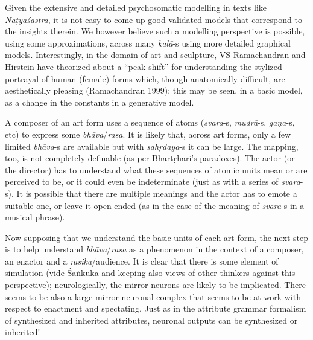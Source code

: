  Given the extensive and detailed psychosomatic modelling in texts like \textsl{Nāṭyaśāstra}, it is not easy to come up good validated models that correspond to the insights therein. We however believe such a modelling perspective is possible, using some approximations, across many \textsl{kalā}-s using more detailed graphical models. Interestingly, in the domain of art and sculpture, VS Ramachandran and Hirstein have theorized about a “peak shift” for understanding the stylized portrayal of human (female) forms which, though anatomically difficult, are aesthetically pleasing (Ramachandran 1999); this may be seen, in a basic model, as a change in the constants in a generative model.

A composer of an art form uses a sequence of atoms (\textsl{svara}-s, \textsl{mudrā}-s, \textsl{gaṇa}-s, etc) to express some \textsl{bhāva}/\textsl{rasa}. It is likely that, across art forms, only a few limited \textsl{bhāva}-s are available but with \textsl{sahṛdaya}-s it can be large. The mapping, too, is not completely definable (as per Bhartṛhari’s paradoxes). The actor (or the director) has to understand what these sequences of atomic units mean or are perceived to be, or it could even be indeterminate (just as with a series of \textsl{svara}-s). It is possible that there are multiple meanings and the actor has to emote a suitable one, or leave it open ended (as in the case of the meaning of \textsl{svara}-s in a musical phrase).

Now supposing that we understand the basic units of each art form, the next step is to help understand \textsl{bhāva}/\textsl{rasa} as a phenomenon in the context of a composer, an enactor and a \textsl{rasika}/audience. It is clear that there is some element of simulation (vide Śaṅkuka and keeping also views of other thinkers against this perspective); neurologically, the mirror neurons are likely to be implicated. There seems to be also a large mirror neuronal complex that seems to be at work with respect to enactment and spectating. Just as in the attribute grammar formalism of synthesized and inherited attributes, neuronal outputs can be synthesized or inherited!

